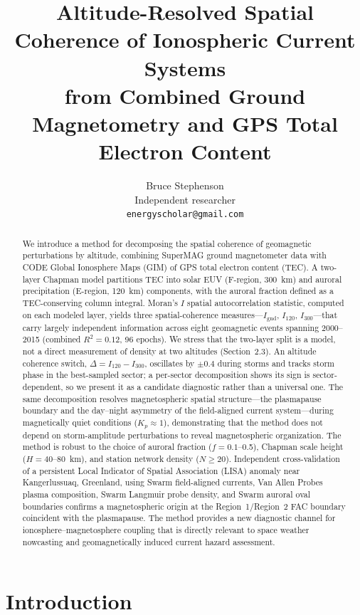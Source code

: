 \documentclass[11pt,letterpaper]{article}
\title{Altitude-Resolved Spatial Coherence of Ionospheric Current Systems\\
from Combined Ground Magnetometry and GPS Total Electron Content}
\author{Bruce Stephenson\\
Independent researcher\\
\texttt{energyscholar@gmail.com}}
\date{}
\begin{document}
\maketitle

\begin{abstract}
We introduce a method for decomposing the spatial coherence of geomagnetic
perturbations by altitude, combining SuperMAG ground magnetometer data with CODE
Global Ionosphere Maps (GIM) of GPS total electron content (TEC). A two-layer
Chapman model partitions TEC into solar EUV (F-region, 300~km) and auroral
precipitation (E-region, 120~km) components, with the auroral fraction defined as
a TEC-conserving column integral. Moran's $I$ spatial autocorrelation
statistic, computed on each modeled layer, yields three spatial-coherence
measures---$I_\mathrm{gnd}$, $I_{120}$, $I_{300}$---that carry largely
independent information across eight geomagnetic events spanning 2000--2015
(combined $R^2 = 0.12$, 96 epochs). We stress that the two-layer split is a
model, not a direct measurement of density at two altitudes (Section~2.3). An altitude coherence switch,
$\Delta = I_{120} - I_{300}$, oscillates by $\pm 0.4$ during storms and tracks
storm phase in the best-sampled sector; a per-sector decomposition shows its sign
is sector-dependent, so we present it as a candidate diagnostic rather than a
universal one. The same decomposition resolves magnetospheric spatial
structure---the plasmapause boundary and the day--night asymmetry of the
field-aligned current system---during magnetically quiet conditions
($K_p \approx 1$), demonstrating that the method does not depend on
storm-amplitude perturbations to reveal magnetospheric organization.
The method is robust to the choice of auroral fraction ($f = 0.1$--0.5),
Chapman scale height ($H = 40$--80~km), and station network density ($N \geq 20$).
Independent cross-validation of a persistent Local Indicator of Spatial
Association (LISA) anomaly near Kangerlussuaq, Greenland, using Swarm
field-aligned currents, Van Allen Probes plasma composition, Swarm Langmuir probe
density, and Swarm auroral oval boundaries confirms a magnetospheric origin at the
Region~1/Region~2 FAC boundary coincident with the plasmapause. The method
provides a new diagnostic channel for ionosphere--magnetosphere coupling that is
directly relevant to space weather nowcasting and geomagnetically induced current
hazard assessment.
\end{abstract}

\section{Introduction}
\end{document}
